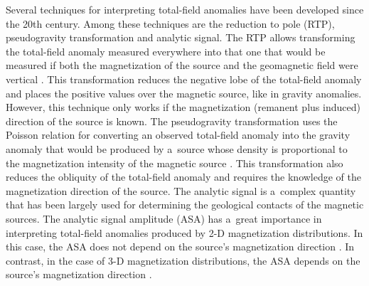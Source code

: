 \documentclass[journal abbreviation, npg]{copernicus}
\begin{document}
Several techniques for interpreting total-field anomalies have been developed
since the 20th century. Among these techniques are the reduction to pole
(RTP), pseudogravity transformation and analytic signal. The RTP allows
transforming the total-field anomaly measured everywhere into that one that
would be measured if both the magnetization of the source and the geomagnetic
field were vertical \citep{baranov1957,baranov-naudy1964,silva1986}. This
transformation reduces the negative lobe of the total-field anomaly and
places the positive values over the magnetic source, like in gravity
anomalies. However, this technique only works if the magnetization (remanent
plus induced) direction of the source is known. The pseudogravity
transformation uses the Poisson relation for converting an observed
total-field anomaly into the gravity anomaly that would be produced by
a~source whose density is proportional to the magnetization intensity of the
magnetic source \citep{baranov1957}. This transformation also reduces the
obliquity of the total-field anomaly and requires the knowledge of the
magnetization direction of the source. The analytic signal is a~complex
quantity that has been largely used for determining the geological contacts
of the magnetic sources. The analytic signal amplitude (ASA) has a~great
importance in interpreting total-field anomalies produced by 2-D
magnetization distributions. In this case, the ASA does not depend on the
source's magnetization direction \citep{nabighian1972,nabighian1974}. In
contrast, in the case of 3-D magnetization distributions, the ASA depends on
the source's magnetization direction \citep{nabighian1984,li2006}.
\end{document}
